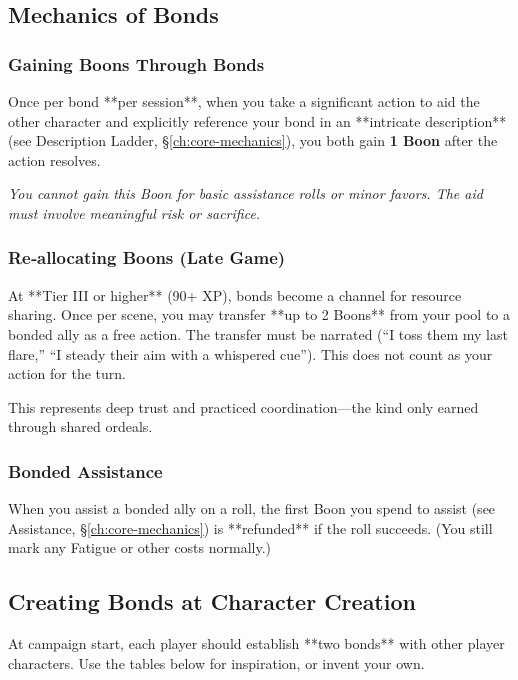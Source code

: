 \subsection{Mechanics of Bonds}

\subsubsection*{Gaining Boons Through Bonds}
Once per bond **per session**, when you take a significant action to aid the other character and explicitly reference your bond in an **intricate description** (see Description Ladder, §\ref{ch:core-mechanics}), you both gain \textbf{1 Boon} after the action resolves.

\textit{You cannot gain this Boon for basic assistance rolls or minor favors. The aid must involve meaningful risk or sacrifice.}

\subsubsection*{Re‑allocating Boons (Late Game)}
At **Tier III or higher** (90+ XP), bonds become a channel for resource sharing. Once per scene, you may transfer **up to 2 Boons** from your pool to a bonded ally as a free action. The transfer must be narrated (“I toss them my last flare,” “I steady their aim with a whispered cue”). This does not count as your action for the turn.

This represents deep trust and practiced coordination—the kind only earned through shared ordeals.

\subsubsection*{Bonded Assistance}
When you assist a bonded ally on a roll, the first Boon you spend to assist (see Assistance, §\ref{ch:core-mechanics}) is **refunded** if the roll succeeds. (You still mark any Fatigue or other costs normally.)

\subsection{Creating Bonds at Character Creation}

At campaign start, each player should establish **two bonds** with other player characters. Use the tables below for inspiration, or invent your own.

